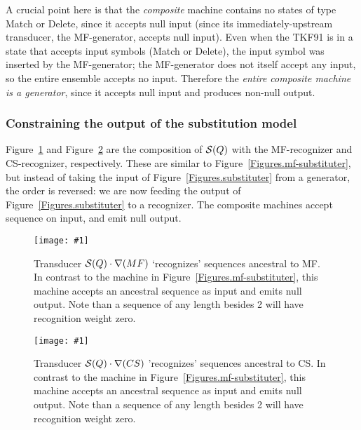 \documentclass{article}
\newcommand{\figref}[1]{Figure~\ref{Figures.#1}}
\newcommand{\figlabel}[1]{\label{Figures.#1}}
\newcommand{\easyfig}[4]{
\begin{figure}
\texttt{[image: \#1]}
\caption{ \figlabel{#3} #4}
\end{figure}}
\newcommand{\pdffig}[2]{\easyfig{#1-fig.pdf}{}{#1}{#2}}
\newcommand{\tallpdffig}[2]{\easyfig{#1-fig.pdf}{height=\textheight}{#1}{#2}}
\newcommand\substitute{{\cal S}}
\newcommand\tkf{{\cal B}}
\newcommand\recognize{\nabla}
\begin{document}
A crucial point here is that the {\em composite} machine contains no states of
 type Match or Delete, since it accepts null input (since its immediately-upstream
transducer, the MF-generator, accepts null input).  
Even when the TKF91 is in a state that accepts input symbols (Match or Delete),
the input symbol was inserted by the MF-generator;
the MF-generator does not itself accept any input,
so the entire ensemble accepts no input.  
Therefore the {\em entire composite machine is a generator}, since it accepts null input
and produces non-null output.  


\subsubsection{Constraining the output of the substitution model}
\figref{substituter-mf}  and \figref{substituter-cs}  are the composition of $\substitute(Q)$ with the MF-recognizer and CS-recognizer, respectively.  
These are similar to 
\figref{mf-substituter},
but instead of taking the input of \figref{substituter} from a generator,
the order is reversed: we are now feeding the output of \figref{substituter} to a recognizer.
The composite machines accept sequence on input, and emit null output.


\pdffig{substituter-mf}{Transducer $\substitute(Q) \cdot \recognize(MF)$ `recognizes' sequences ancestral to MF.  In contrast to the machine in \figref{mf-substituter}, this machine accepts an ancestral sequence as input and emits null output.  Note than a sequence of any length besides 2 will have recognition weight zero. }

\pdffig{substituter-cs}{Transducer $\substitute(Q) \cdot \recognize(CS)$ 'recognizes' sequences ancestral to CS.  In contrast to the machine in \figref{mf-substituter}, this machine accepts an ancestral sequence as input and emits null output.  Note than a sequence of any length besides 2 will have recognition weight zero. }




\end{document}
